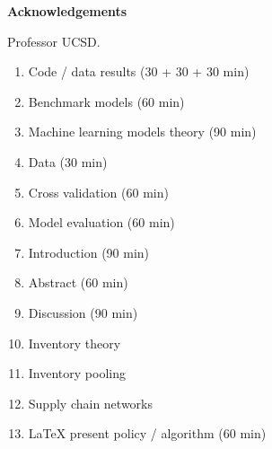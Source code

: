 \documentclass[../../main.tex]{subfiles}
\begin{document}
\thispagestyle{empty}
\newenvironment{acknowledgements}%
    {\cleardoublepage\thispagestyle{empty}\null\vfill\begin{center}%
    \vspace{0pt}
    \bfseries Acknowledgements\end{center}}%
    {\vfill\null}
        \begin{acknowledgements}

Professor UCSD.
\begin{enumerate}
\item Code / data results (30 + 30 + 30 min)
\item Benchmark models (60 min)
\item Machine learning models theory (90 min)
\item Data (30 min)
\item Cross validation (60 min)
\item Model evaluation (60 min)
%
\item Introduction (90 min)
\item Abstract (60 min)
\item Discussion (90 min)
\item Inventory theory
\item Inventory pooling
\item Supply chain networks
\item LaTeX present policy / algorithm (60 min)
\end{enumerate}



        \end{acknowledgements}
\end{document}
